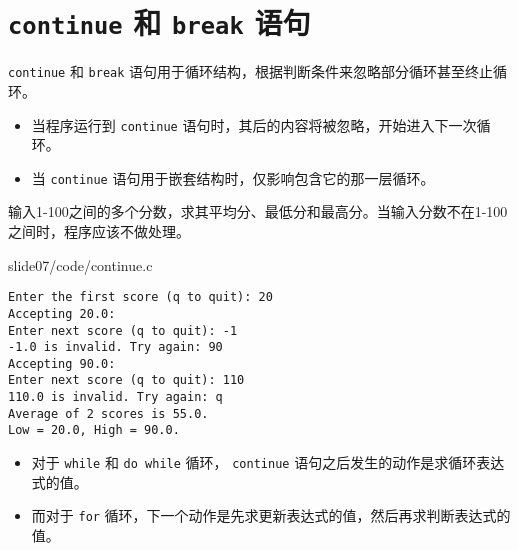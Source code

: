 \section{ \lstinline|continue| 和 \lstinline|break| 语句}
\begin{frame}[fragile]\ft{\secname}
 \lstinline|continue| 和 \lstinline|break| 语句用于循环结构，根据判断条件来忽略部分循环甚至终止循环。
\end{frame}


\begin{frame}[fragile]
\begin{itemize}
\item
当程序运行到 \lstinline|continue| 语句时，其后的内容将被忽略，开始进入下一次循环。\\[0.1in]
\item
当 \lstinline|continue| 语句用于嵌套结构时，仅影响包含它的那一层循环。
\end{itemize}
\end{frame}


\begin{frame}[fragile]
\begin{free}[例]{}
输入1-100之间的多个分数，求其平均分、最低分和最高分。当输入分数不在1-100之间时，程序应该不做处理。
\end{free}

\end{frame}


\begin{frame}

{slide07/code/continue.c}
\end{frame}

\begin{frame}[fragile]
\begin{lstlisting}[backgroundcolor=\color{red!10}]
Enter the first score (q to quit): 20
Accepting 20.0:
Enter next score (q to quit): -1
-1.0 is invalid. Try again: 90
Accepting 90.0:
Enter next score (q to quit): 110
110.0 is invalid. Try again: q
Average of 2 scores is 55.0.
Low = 20.0, High = 90.0.
\end{lstlisting}

\end{frame}

\begin{frame}[fragile]
\begin{itemize}
\item 对于 \lstinline|while| 和 \lstinline|do while| 循环， \lstinline|continue| 语句之后发生的动作是求循环表达式的值。\\[0.1in]
\item 而对于 \lstinline|for| 循环，下一个动作是先求更新表达式的值，然后再求判断表达式的值。
\end{itemize}

\end{frame}

